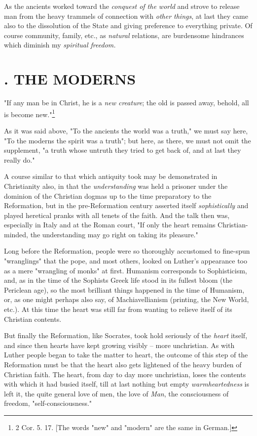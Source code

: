 As the ancients worked toward the \textit{conquest of the world} and strove to 
release man from the heavy trammels of connection with \textit{other things}, 
at last they came also to the dissolution of the State and giving preference 
to everything private. Of course community, family, etc., as \textit{natural} 
relations, are burdensome hindrances which diminish my \textit{spiritual 
freedom.}

\medskip{}

\section[2. The Moderns]{. THE MODERNS}

"{}If any man be in Christ, he is a \textit{new creature}; the old is passed 
away, behold, all is become new."{}\footnote{2 Cor. 5. 17. [The words 
"{}new"{} and "{}modern"{} are the same in German.]}

As it was said above, "{}To the ancients the world was a truth,"{} we must say 
here, "{}To the moderns the spirit was a truth"{}; but here, as there, we must 
not omit the supplement, "{}a truth whose untruth they tried to get back of, 
and at last they really do."{}

A course similar to that which antiquity took may be demonstrated in 
Christianity also, in that the \textit{understanding} was held a prisoner 
under the dominion of the Christian dogmas up to the time preparatory to the 
Reformation, but in the pre-Reformation century asserted itself 
\textit{sophistically} and played heretical pranks with all tenets of the 
faith. And the talk then was, especially in Italy and at the Roman court, 
"{}If only the heart remains Christian-minded, the understanding may go right 
on taking its pleasure."{}

Long before the Reformation, people were so thoroughly accustomed to fine-spun 
"{}wranglings"{} that the pope, and most others, looked on Luther's appearance 
too as a mere "{}wrangling of monks"{} at first. Humanism corresponds to 
Sophisticism, and, as in the time of the Sophists Greek life stood in its 
fullest bloom (the Periclean age), so the most brilliant things happened in 
the time of Humanism, or, as one might perhaps also say, of Machiavellianism 
(printing, the New World, etc.). At this time the heart was still far from 
wanting to relieve itself of its Christian contents.

But finally the Reformation, like Socrates, took hold seriously of the 
\textit{heart} itself, and since then hearts have kept growing visibly -- more 
unchristian. As with Luther people began to take the matter to heart, the 
outcome of this step of the Reformation must be that the heart also gets 
lightened of the heavy burden of Christian faith. The heart, from day to day 
more unchristian, loses the contents with which it had busied itself, till at 
last nothing but empty \textit{warmheartedness} is left it, the quite general 
love of men, the love of \textit{Man}, the consciousness of freedom, 
"{}self-consciousness."{}

